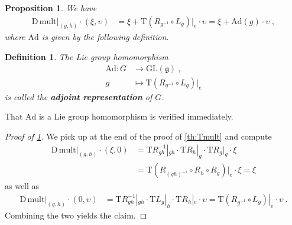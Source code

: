 \documentclass[10pt,a4paper]{article}
\theoremstyle{mytheorem}
\newtheorem{proposition}[theorem]{Proposition}
\theoremstyle{mydefinition}
\newtheorem{definition}[theorem]{Definition}
\newcommand{\mydef}[1]{\textbf{\textit{#1}}}
\newcommand{\Dt}{\mathrm{D}}
\newcommand{\Tt}{\mathrm{T}}
\newcommand{\Ad}{\mathrm{Ad}}
\begin{document}
\begin{proposition}
\label{th:Dmult}
We have
\begin{align*}
	\Dt\,\mathrm{mult}|_{(g, h)} \cdot (\xi, \upsilon)
	&=
	\xi + \Tt(R_{g^{-1}}\circ L_g)|_e\cdot\upsilon
	=
	\xi + \Ad(g)\cdot\upsilon
	\ ,
\end{align*}
where $\Ad$ is given by the following definition.
\end{proposition}

\begin{definition}
\label{def:Ad}
The Lie group homomorphism
\begin{align*}
	\Ad: G&\rightarrow \mathrm{GL}(\mathfrak{g})
	\ ,\nonumber\\
	g &\mapsto
	\Tt
	(R_{g^{-1}}\circ L_g)|_e
\end{align*}
is called the \mydef{adjoint representation} of $G$.
\end{definition}

That $\Ad$ is a Lie group homomorphism is verified immediately.

\begin{proof}[Proof of \ref{th:Dmult}]
We pick up at the end of the proof of \ref{th:Tmult} and compute
\begin{align*}
	\Dt\,\mathrm{mult}|_{(g,h)}\cdot (\xi, 0)
	&= 
	\Tt R_{gh}^{-1}|_{gh}
	\cdot
	\Tt R_h|_g
	\cdot
	\Tt R_g|_g
	\cdot\xi
	\nonumber\\
	&= \Tt (R_{(gh)^{-1}}\circ R_h\circ R_g)|_e\cdot\xi
	= \xi
\end{align*}
as well as
\begin{align*}
	\Dt\,\mathrm{mult}|_{(g,h)}\cdot (0, \upsilon)
	&=
	\Tt R_{gh}^{-1}|_{gh}
	\cdot	
	\Tt L_g|_h
	\cdot
	\Tt R_h|_e
	\cdot
	\upsilon
	=
	\Tt
	(R_{g^{-1}}\circ L_g)|_e
	\cdot
	\upsilon	
	\ .
\end{align*}
Combining the two yields the claim.
\end{proof}
\end{document}
